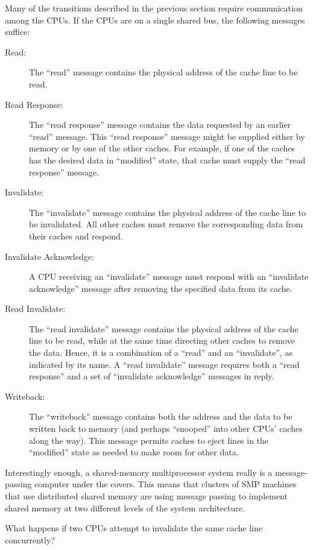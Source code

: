 Many of the transitions described in the previous section require
communication among the CPUs.
If the CPUs are on a single shared bus, the following messages suffice:
\begin{description}
\item[Read:]
	The ``read'' message contains the physical address of the cache line
	to be read.
\item[Read Response:]
	The ``read response'' message contains the data requested by an
	earlier ``read'' message.
	This ``read response'' message might be supplied either by
	memory or by one of the other caches.
	For example, if one of the caches has the desired data in
	``modified'' state, that cache must supply the ``read response''
	message.
\item[Invalidate:]
	The ``invalidate'' message contains the physical address of the
	cache line to be invalidated.
	All other caches must remove the corresponding data from their
	caches and respond.
\item[Invalidate Acknowledge:]
	A CPU receiving an ``invalidate'' message must respond with an
	``invalidate acknowledge'' message after removing the specified
	data from its cache.
\item[Read Invalidate:]
	The ``read invalidate'' message contains the physical address
	of the cache line to be read, while at the same time directing
	other caches to remove the data.
	Hence, it is a combination of a ``read'' and an ``invalidate'',
	as indicated by its name.
	A ``read invalidate'' message requires both a ``read response''
	and a set of ``invalidate acknowledge'' messages in reply.
\item[Writeback:]
	The ``writeback'' message contains both the address and the
	data to be written back to memory (and perhaps ``snooped''
	into other CPUs' caches along the way).
	This message permits caches to eject lines in the ``modified''
	state as needed to make room for other data.
\end{description}

Interestingly enough, a shared-memory multiprocessor system really
is a message-passing computer under the covers.
This means that clusters of SMP machines that use distributed shared memory
are using message passing to implement shared memory at two different
levels of the system architecture.

\QuickQuiz{}
	What happens if two CPUs attempt to invalidate the
	same cache line concurrently?
 \QuickQuizEnd

